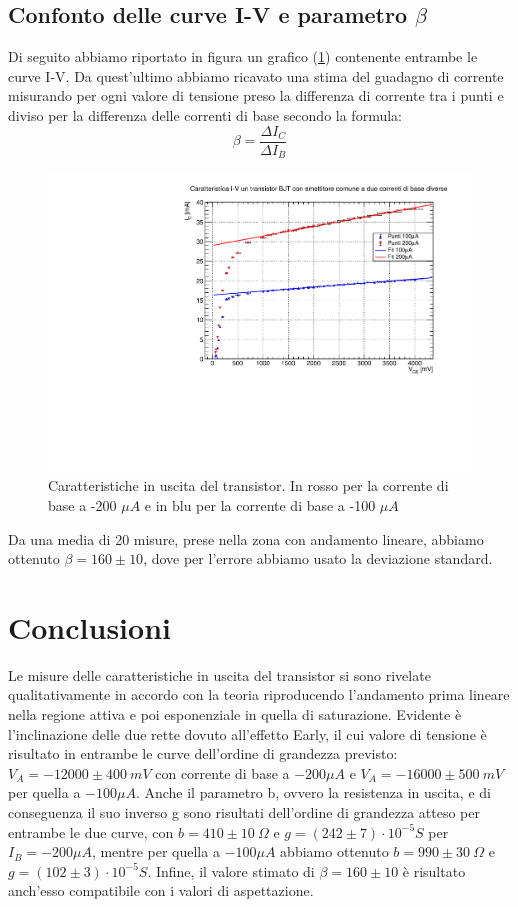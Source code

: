 \documentclass[]{article}
\begin{document}
\subsection{Confonto delle curve I-V e parametro $ \beta $}
Di seguito abbiamo riportato in figura un grafico (\ref{fig:multigrafo}) contenente entrambe le curve I-V. Da quest'ultimo abbiamo ricavato una stima del guadagno di corrente misurando per ogni valore di tensione preso la differenza di corrente tra i punti e diviso per la differenza delle correnti di base secondo la formula:
\begin{equation}
	\beta=\frac{\Delta I_{C}}{\Delta I_{B}}
\end{equation}
	\begin{figure}[H]
		\centering
		\includegraphics[width=0.9\linewidth]{../c1}
		\caption{Caratteristiche in uscita del transistor. In rosso per la corrente di base a -200 $ \mu A $ e in blu per la corrente di base a -100 $ \mu A $}
		\label{fig:multigrafo}
	\end{figure}
Da una media di 20 misure, prese nella zona con andamento lineare, abbiamo ottenuto $ \beta =160\pm 10 $, dove per l'errore abbiamo usato la deviazione standard.
\section*{Conclusioni}
Le misure delle caratteristiche in uscita del transistor si sono rivelate qualitativamente in accordo con la teoria riproducendo l'andamento prima lineare nella regione attiva e poi esponenziale in quella di saturazione. Evidente è l'inclinazione delle due rette dovuto all'effetto Early, il cui valore di tensione è risultato in entrambe le curve dell'ordine di grandezza previsto: $ V_{A}=-12000\pm400\ mV $ con corrente di base a $ -200 \mu A $ e $ V_{A}=-16000\pm500\ mV $ per quella a $ -100 \mu A $.  
Anche il parametro b, ovvero la resistenza in uscita, e di conseguenza il suo inverso g sono risultati dell'ordine di grandezza atteso per entrambe le due curve, con $ b=410\pm10\ \Omega $ e $ g=(242\pm7)\cdot 10^{-5} S $ per $ I_{B}= -200 \mu A $, mentre per quella a $ -100 \mu A $ abbiamo ottenuto $ b= 990\pm30\ \Omega$ e $ g=(102\pm3)\cdot 10^{-5} S  $. 
Infine, il valore stimato di $ \beta= 160\pm 10$ è risultato anch'esso compatibile con i valori di aspettazione.
\end{document}
